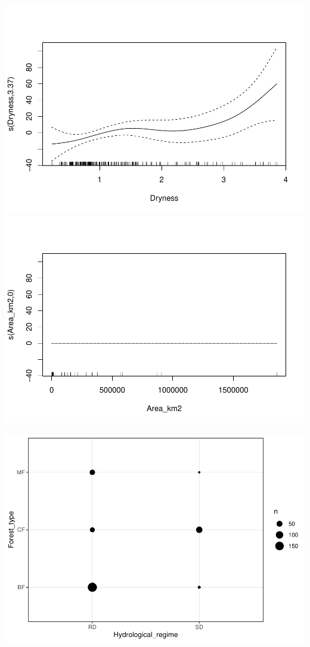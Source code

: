 \documentclass[]{elsarticle} %
\begin{document}
\includegraphics{Forest_and_Water_files/figure-latex/model7_noLatb-1.pdf}
\includegraphics{Forest_and_Water_files/figure-latex/model7_noLatb-2.pdf}

\includegraphics{Forest_and_Water_files/figure-latex/unnamed-chunk-23-1.pdf}
\end{document}
